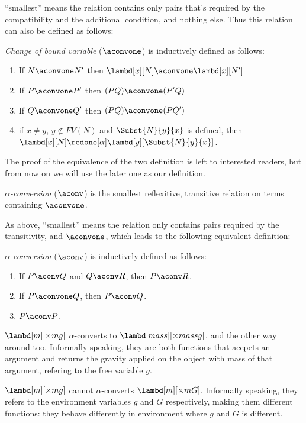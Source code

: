 \documentclass[../../../include/open-logic-section]{subfiles}
\begin{document}
``smallest'' means the relation contains only pairs that's required by
the compatibility and the additional condition, and nothing else. Thus
this relation can also be defined as follows:
\begin{defn} 
  \emph{Change of bound variable} ($\aconvone$) is inductively
  defined as follows:
  \begin{enumerate}
  \item If $N \aconvone N'$ then $\lambd[x][N] \aconvone
    \lambd[x][N']$ 
  \item If $P \aconvone P'$ then $(PQ) \aconvone (P'Q)$ 
  \item If $Q \aconvone Q'$ then $(PQ) \aconvone (PQ')$ 
  \item if $x \neq y$, $y \notin FV(N)$ and $\Subst{N}{y}{x}$ is defined, then
    $\lambd[x][N] \redone[\alpha] \lambd[y][\Subst{N}{y}{x}]$.
    
  \end{enumerate}
\end{defn}

The proof of the equivalence of the two definition is left to
interested readers, but from now on we will use the later one as our
definition.

\begin{defn}
  \emph{$\alpha$-conversion} ($\aconv$) is the smallest reflexitive, transitive relation on terms containing $\aconvone$.
\end{defn}

As above, ``smallest'' means the relation only contains pairs required
by the transitivity, and $\aconvone$, which leads to the following equivalent definition:
\begin{defn}
  \emph{$\alpha$-conversion} ($\aconv$) is inductively defined as follows:
  \begin{enumerate}
  \item If $P \aconv Q$ and $Q \aconv R$, then $P \aconv R$.
  \item If $P \aconvone Q$, then $P \aconv Q$. 
  \item $P \aconv P$. 
  \end{enumerate}
\end{defn}

\begin{ex}
  $\lambd[m][\times m g]$ $\alpha$-converts to $\lambd[mass][\times mass
  g]$, and the other way around too. Informally
  speaking, they are both functions that accpets an argument and
  returns the gravity applied on the object with mass of that argument,
  refering to the free variable $g$.
\end{ex}
\begin{ex}
  $\lambd[m][\times m g]$ cannot $\alpha$-converts $\lambd[m][\times m
  G]$. Informally speaking, they refers to the environment variables $g$ and $G$ respectively,
  making them different functions: they behave differently in
  environment where $g$ and $G$ is different.
\end{ex}
\end{document}
